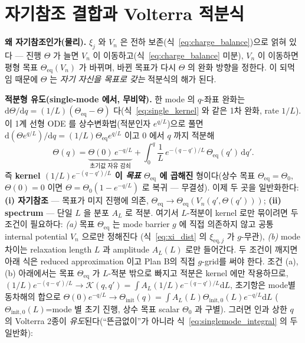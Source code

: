 \documentclass[11pt,a4paper]{article}
\newcommand{\dd}{\mathrm{d}}
\newcommand{\eq}{\mathrm{eq}}
\begin{document}
\section{자기참조 결합과 Volterra 적분식}\label{sec:volterra}
\textbf{왜 자기참조인가(물리).} $\xi_j$ 와 $V_n$ 은 전하 보존(식~\eqref{eq:charge_balance})으로 얽혀 있다 — 진행
$\Theta$ 가 늘면 $V_n$ 이 이동하고(식~\eqref{eq:charge_balance} 미분), $V_n$ 이 이동하면 평형 목표
$\Theta_\eq(V_n)$ 가 바뀌며, 바뀐 목표가 다시 $\Theta$ 의 완화 방향을 정한다. 이 되먹임 때문에 $\Theta$ 는 \emph{자기
자신을 목표로 갖는} 적분식의 해가 된다.

\textbf{적분형 유도(single-mode 에서, 무비약).} 한 mode 의 $q$-좌표 완화는 $\dd\Theta/\dd q=(1/L)(\Theta_\eq-\Theta)$
다(식~\eqref{eq:single_kernel} 와 같은 1차 완화, rate $1/L$). 이 1계 선형 ODE 를 상수변화법(적분인자 $e^{q/L}$)으로
풀면 $\dd(\Theta e^{q/L})/\dd q=(1/L)\Theta_\eq e^{q/L}$ 이고 $0$ 에서 $q$ 까지 적분해
\begin{equation}
\Theta(q)=\underbrace{\Theta(0)\,e^{-q/L}}_{\text{초기값 자유 감쇠}}+\int_0^q \frac1L\,e^{-(q-q')/L}\,\Theta_\eq(q')\,\dd q'.
\label{eq:singlemode_integral}
\end{equation}
즉 \textbf{kernel $(1/L)e^{-(q-q')/L}$ 이 \emph{목표} $\Theta_\eq$ 에 곱해진} 형이다(상수 목표 $\Theta_\eq=\Theta_0$,
$\Theta(0)=0$ 이면 $\Theta=\Theta_0(1-e^{-q/L})$ 로 복귀 — 무결성). 이제 두 곳을 일반화한다: \textbf{(i) 자기참조} —
목표가 미지 진행에 의존, $\Theta_\eq\to\Theta_\eq(V_n(q',\Theta(q')))$; \textbf{(ii) spectrum} — 단일 $L$ 을
분포 $A_L$ 로 적분. 여기서 $L$-적분이 kernel 로만 묶이려면 두 조건이 필요하다:
\emph{(a)} 목표 $\Theta_\eq$ 는 mode barrier $g$ 에 직접 의존하지 않고 공통 internal potential $V_n$ 으로만 정해진다
(식~\eqref{eq:xi_dist} 의 $\xi_{\eq,j}$ 가 $g$-무관), \emph{(b)} mode 차이는 relaxation length $L$ 과 amplitude
$A_L(L)$ 로만 들어간다. 두 조건이 깨지면 아래 식은 reduced approximation 이고 Plan B의 직접 $g$-grid를 써야 한다.
조건 (a),(b) 아래에서는 목표 $\Theta_\eq$ 가 $L$-적분 밖으로 빠지고 적분은 kernel 에만 작용하므로,
$(1/L)e^{-(q-q')/L}\to\mathcal K(q,q')=\int
A_L(1/L)e^{-(q-q')/L}\dd L$, 초기항은 mode별 동차해의 합으로
$\Theta(0)e^{-q/L}\to\Theta_\mathrm{init}(q)=\int A_L(L)\Theta_{\mathrm{init},0}(L)e^{-q/L}\dd L$
($\Theta_{\mathrm{init},0}(L)$=mode 별 초기 진행, 상수 목표 scalar $\Theta_0$ 과 구별). 그러면 인과 상한 $q$ 의 Volterra 2종이
\emph{유도}된다(``뜬금없이''가 아니라 식~\eqref{eq:singlemode_integral} 의 두 일반화):
\end{document}
